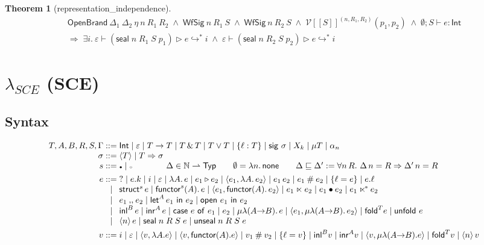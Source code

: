 \documentclass[10pt]{article}
\newtheorem{theorem}{Theorem}[section]
\newcommand{\Int}{\mathsf{Int}}
\newcommand{\tp}{\varepsilon}
\newcommand{\bra}[1]{\alpha_{#1}}
\newcommand{\mrg}{\mathbin{\#}}
\newcommand{\qry}{{?}}
\newcommand{\bx}{\mathbin{\triangleright}}
\newcommand{\wrp}[2]{\langle #1\rangle\,#2}
\newcommand{\sealE}[4]{\mathsf{seal}\;#1\;#2\;#3\;#4}
\newcommand{\unsealE}[4]{\mathsf{unseal}\;#1\;#2\;#3\;#4}
\newcommand{\msteps}[3]{#1 \vdash #2 \hookrightarrow^{*} #3}
\newcommand{\hast}[4]{#1; #2 \vdash #3 : #4}
\newcommand{\storele}{\sqsubseteq}
\newcommand{\sT}[1]{[\![#1]\!]}
\newcommand{\sbx}{{\scriptscriptstyle\bullet}}
\newcommand{\opn}{{\scriptscriptstyle\circ}}
\newcommand{\LRg}[2]{\mathcal{V}\sT{#2}^{#1}}
\begin{document}
\begin{theorem}[\textsf{representation\_independence}]
\[
\begin{array}{l}
\mathsf{OpenBrand}\ \Delta_1\ \Delta_2\ \eta\ n\ R_1\ R_2 \;\wedge\;
\mathsf{WfSig}\ n\ R_1\ S \;\wedge\; \mathsf{WfSig}\ n\ R_2\ S \;\wedge\;
\LRg{(n,R_1,R_2)}{S}(p_1,p_2) \;\wedge\; \hast{\emptyset}{S}{e}{\Int} \\
\Longrightarrow\;
\exists i.\ \msteps{\tp}{(\sealE{n}{R_1}{S}{p_1}) \bx e}{i} \;\wedge\; \msteps{\tp}{(\sealE{n}{R_2}{S}{p_2}) \bx e}{i}
\end{array}
\]
\end{theorem}

\section{$\lambda_{SCE}$ (SCE)}

\subsection{Syntax}

\[
\begin{array}{r@{\;}c@{\;}l}
T, A, B, R, S, \Gamma &::=& \Int \mid \tp \mid T \to T \mid T \,\&\, T \mid T \vee T \mid \{\ell : T\} \mid \mathsf{sig}\ \sigma \mid X_k \mid \mu T \mid \bra{n} \\
\sigma &::=& \langle T \rangle \mid T \Rightarrow \sigma \\
s &::=& \sbx \mid \opn \qquad\qquad \Delta \in \mathbb{N} \rightharpoonup \mathsf{Typ} \qquad \emptyset = \lambda n.\,\mathsf{none} \qquad \Delta \storele \Delta' := \forall n\,R.\ \Delta\,n = R \Rightarrow \Delta'\,n = R \\[4pt]
e &::=& \qry \mid e.k \mid i \mid \tp \mid \lambda A.\,e \mid e_1 \bx e_2 \mid \langle e_1, \lambda A.\,e_2 \rangle \mid e_1\,e_2
       \mid e_1 \mrg e_2 \mid \{\ell = e\} \mid e.\ell \\
  &\mid& \mathsf{struct}^{s}\,e \mid \mathsf{functor}^{s}(A).\,e \mid \langle e_1, \mathsf{functor}(A).\,e_2 \rangle \mid e_1 \ltimes e_2 \mid e_1 \bullet e_2 \mid e_1 \ltimes^{\!*} e_2 \\
  &\mid& e_1 \mathbin{,\!,} e_2 \mid \mathsf{let}^{A}\,e_1\ \mathsf{in}\ e_2 \mid \mathsf{open}\ e_1\ \mathsf{in}\ e_2 \\
  &\mid& \mathsf{inl}^{B}\,e \mid \mathsf{inr}^{A}\,e \mid \mathsf{case}\ e\ \mathsf{of}\ e_1 \mid e_2
       \mid \mu\lambda(A{\to}B).\,e \mid \langle e_1, \mu\lambda(A{\to}B).\,e_2 \rangle \mid \mathsf{fold}^{T} e \mid \mathsf{unfold}\ e \\
  &\mid& \wrp{n}{e} \mid \sealE{n}{R}{S}{e} \mid \unsealE{n}{R}{S}{e} \\[4pt]
v &::=& i \mid \tp \mid \langle v, \lambda A.e \rangle \mid \langle v, \mathsf{functor}(A).e \rangle \mid v_1 \mrg v_2 \mid \{\ell = v\}
      \mid \mathsf{inl}^{B} v \mid \mathsf{inr}^{A} v \mid \langle v, \mu\lambda(A{\to}B).e\rangle \mid \mathsf{fold}^{T} v \mid \wrp{n}{v}
\end{array}
\]
\end{document}
